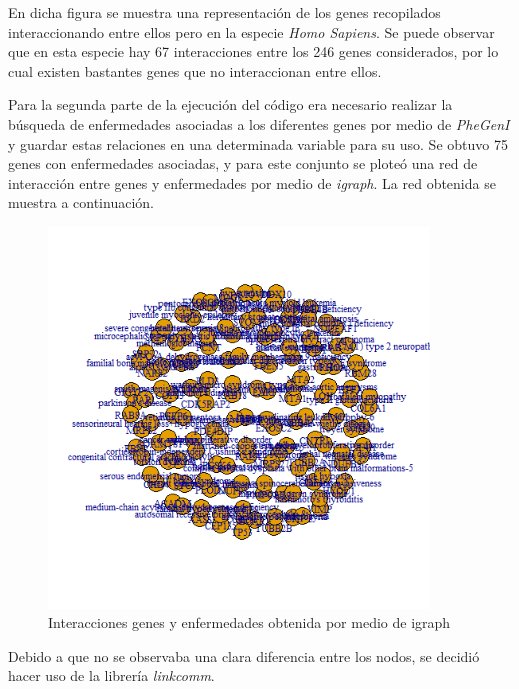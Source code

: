 En dicha figura se muestra una representación de los genes recopilados interaccionando entre ellos pero en la especie \textit{Homo Sapiens}. Se puede observar que en esta especie hay 67 interacciones entre los 246 genes considerados, por lo cual existen bastantes genes que no interaccionan entre ellos.

\newline

Para la segunda parte de la ejecución del código era necesario realizar la búsqueda de enfermedades asociadas a los diferentes genes por medio de \textit{PheGenI} y guardar estas relaciones en una determinada variable para su uso. Se obtuvo 75 genes con enfermedades asociadas, y para este conjunto se ploteó una red de interacción entre genes y enfermedades por medio de \textit{igraph}. La red obtenida se muestra a continuación.

\newline

\begin{figure}[h!]
	\includegraphics[width=0.9\textwidth]{figures/figuraiGraph.png}
	\caption{Interacciones genes y enfermedades obtenida por medio de igraph}
	\label{fig:red_igraph}
\end{figure}

\newline

Debido a que no se observaba una clara diferencia entre los nodos, se decidió hacer uso de la librería \textit{linkcomm}.

